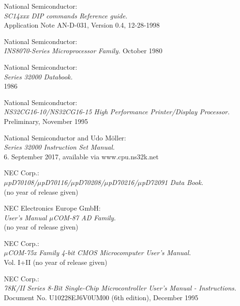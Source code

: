  National Semiconductor: \\
                   {\em SC14xxx DIP commands Reference guide.} \\
                   Application Note AN-D-031, Version 0.4, 12-28-1998

 National Semiconductor: \\ 
                  {\em INS8070-Series Microprocessor Family.\/} 
                  October 1980 

 National Semiconductor: \\
                  {\em Series 32000 Databook.\/} \\
                  1986

 National Semiconductor: \\
                  {\em NS32CG16-10/NS32CG16-15 High Performance Printer/Display Processor.\/} \\
                  Preliminary, November 1995

 National Semiconductor and Udo M\"oller: \\
                  {\em Series 32000 Instruction Set Manual.\/} \\
                  6. September 2017, available via www.cpu.ns32k.net

 NEC Corp.: \\
   	       {\em $\mu$pD70108/$\mu$pD70116/$\mu$pD70208/$\mu$pD70216/$\mu$pD72091 
               Data Book.\/} \\
               (no year of release given)

 NEC Electronics Europe GmbH: \\
                  {\em User's Manual $\mu$COM-87 AD Family.\/} \\
		  (no year of release given)

 NEC Corp.: \\
                {\em $\mu$COM-75x Family 4-bit CMOS Microcomputer User's
                 Manual.\/} \\
                Vol. I+II (no year of release given)

 NEC Corp.: \\
                {\em 78K/II Series 8-Bit Single-Chip Microcontroller
                 User's Manual - Instructions.\/} \\
                Document No. U10228EJ6V0UM00 (6th edition), December 1995

